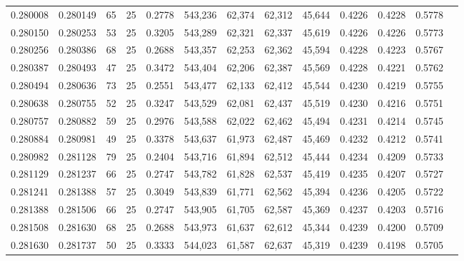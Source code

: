 \begin{tabular}{rrrrrrrrrrrrr}
0.280008 & 0.280149 &    65 &  25 &                                     0.2778 & 543,236 &  62,374 &  62,312 &  45,644 & 0.4226 & 0.4228 & 0.5778 \\
0.280150 & 0.280253 &    53 &  25 &                                     0.3205 & 543,289 &  62,321 &  62,337 &  45,619 & 0.4226 & 0.4226 & 0.5773 \\
0.280256 & 0.280386 &    68 &  25 &                                     0.2688 & 543,357 &  62,253 &  62,362 &  45,594 & 0.4228 & 0.4223 & 0.5767 \\
0.280387 & 0.280493 &    47 &  25 &                                     0.3472 & 543,404 &  62,206 &  62,387 &  45,569 & 0.4228 & 0.4221 & 0.5762 \\
0.280494 & 0.280636 &    73 &  25 &                                     0.2551 & 543,477 &  62,133 &  62,412 &  45,544 & 0.4230 & 0.4219 & 0.5755 \\
0.280638 & 0.280755 &    52 &  25 &                                     0.3247 & 543,529 &  62,081 &  62,437 &  45,519 & 0.4230 & 0.4216 & 0.5751 \\
0.280757 & 0.280882 &    59 &  25 &                                     0.2976 & 543,588 &  62,022 &  62,462 &  45,494 & 0.4231 & 0.4214 & 0.5745 \\
0.280884 & 0.280981 &    49 &  25 &                                     0.3378 & 543,637 &  61,973 &  62,487 &  45,469 & 0.4232 & 0.4212 & 0.5741 \\
0.280982 & 0.281128 &    79 &  25 &                                     0.2404 & 543,716 &  61,894 &  62,512 &  45,444 & 0.4234 & 0.4209 & 0.5733 \\
0.281129 & 0.281237 &    66 &  25 &                                     0.2747 & 543,782 &  61,828 &  62,537 &  45,419 & 0.4235 & 0.4207 & 0.5727 \\
0.281241 & 0.281388 &    57 &  25 &                                     0.3049 & 543,839 &  61,771 &  62,562 &  45,394 & 0.4236 & 0.4205 & 0.5722 \\
0.281388 & 0.281506 &    66 &  25 &                                     0.2747 & 543,905 &  61,705 &  62,587 &  45,369 & 0.4237 & 0.4203 & 0.5716 \\
0.281508 & 0.281630 &    68 &  25 &                                     0.2688 & 543,973 &  61,637 &  62,612 &  45,344 & 0.4239 & 0.4200 & 0.5709 \\
0.281630 & 0.281737 &    50 &  25 &                                     0.3333 & 544,023 &  61,587 &  62,637 &  45,319 & 0.4239 & 0.4198 & 0.5705 \\

\end{tabular}
